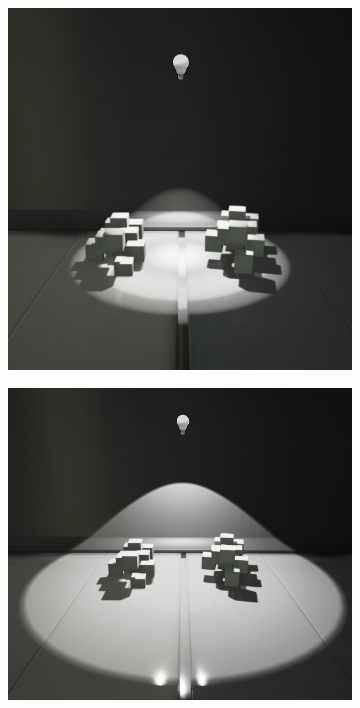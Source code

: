 \begin{figure}
\begin{fullwidth}
\begin{subfigure}[b]{0.213\thewidth}
		\includegraphics[width=1.\textwidth]{figures/intro/IES_02}
	\end{subfigure}
	\begin{subfigure}[b]{0.247\thewidth}
		\includegraphics[width=1.\textwidth]{figures/intro/IES_03}

\end{subfigure}
\end{fullwidth}
\end{figure}
